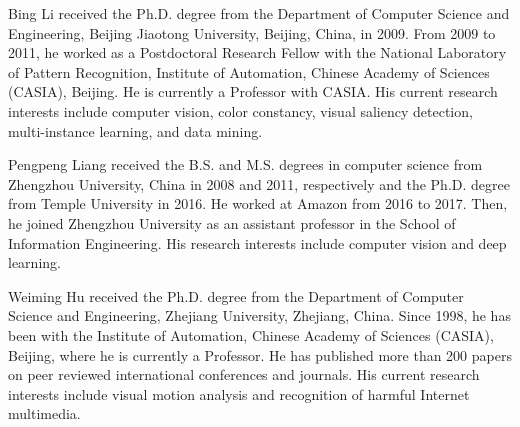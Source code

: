 \documentclass[journal]{IEEEtran}
\begin{document}
\begin{IEEEbiography}
{Bing Li}
received the Ph.D. degree from the Department of Computer Science and Engineering, Beijing Jiaotong University, Beijing, China, in 2009. From 2009 to 2011, he worked as a Postdoctoral Research Fellow with the National Laboratory of Pattern Recognition, Institute of Automation, Chinese Academy of Sciences (CASIA), Beijing. He is currently a Professor with CASIA. His current research interests include computer vision, color constancy, visual saliency detection, multi-instance learning, and data mining.
\end{IEEEbiography}
\vspace{-5mm}

\begin{IEEEbiography}
{Pengpeng Liang}
received the B.S. and M.S. degrees in computer science from Zhengzhou University, China in 2008 and 2011, respectively and the Ph.D. degree from Temple University in 2016. He worked at Amazon from 2016 to 2017. Then, he joined Zhengzhou University as an assistant professor in the School of Information Engineering. His research interests include computer vision and deep learning.
\end{IEEEbiography}
\vspace{-5mm}

\begin{IEEEbiography}
{Weiming Hu}
received the Ph.D. degree from the Department of Computer Science and Engineering, Zhejiang University, Zhejiang, China. Since 1998, he has been with the Institute of Automation, Chinese Academy of Sciences (CASIA), Beijing, where he is currently a Professor. He has published more than 200 papers on peer reviewed international conferences and journals. His current research interests include visual motion analysis and recognition of harmful Internet multimedia.
\end{IEEEbiography}
\end{document}
